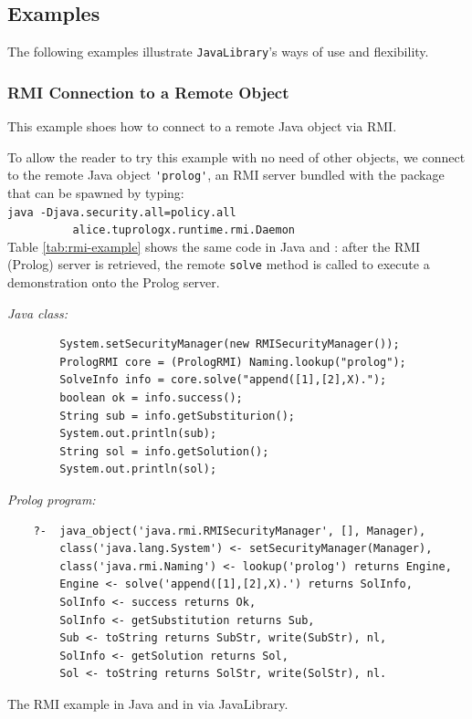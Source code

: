 

\subsection{Examples}

The following examples illustrate \texttt{JavaLibrary}'s ways of use and flexibility.

\subsubsection{RMI Connection to a Remote Object}

This example shoes how to connect to a remote Java object via RMI.

To allow the reader to try this example with no need of other objects, we connect to the remote Java object \verb|'prolog'|, an RMI server bundled with the \tuprolog{} package that can be spawned by typing:\\

{\small\texttt{java -Djava.security.all=policy.all\\
\mbox{~~~~~~~~~~}alice.tuprologx.runtime.rmi.Daemon}}\\

\noindent Table \ref{tab:rmi-example} shows the same code in Java and \tuprolog{}:
after the RMI (Prolog) server is retrieved, the remote \texttt{solve} method is called to execute a demonstration onto the Prolog server.

\begin{table}
\textit{Java class:}
\begin{verbatim}
        System.setSecurityManager(new RMISecurityManager());
        PrologRMI core = (PrologRMI) Naming.lookup("prolog");
        SolveInfo info = core.solve("append([1],[2],X).");
        boolean ok = info.success();
        String sub = info.getSubstiturion();
        System.out.println(sub);
        String sol = info.getSolution();
        System.out.println(sol);
\end{verbatim}
\textit{Prolog program:}
\begin{verbatim}
    ?-  java_object('java.rmi.RMISecurityManager', [], Manager),
        class('java.lang.System') <- setSecurityManager(Manager),
        class('java.rmi.Naming') <- lookup('prolog') returns Engine,
        Engine <- solve('append([1],[2],X).') returns SolInfo,
        SolInfo <- success returns Ok,
        SolInfo <- getSubstitution returns Sub,
        Sub <- toString returns SubStr, write(SubStr), nl,
        SolInfo <- getSolution returns Sol,
        Sol <- toString returns SolStr, write(SolStr), nl.
\end{verbatim}

\caption{The RMI example in Java and in \tuprolog{} via JavaLibrary.}
\label{tab:rmi-example}
\end{table}

